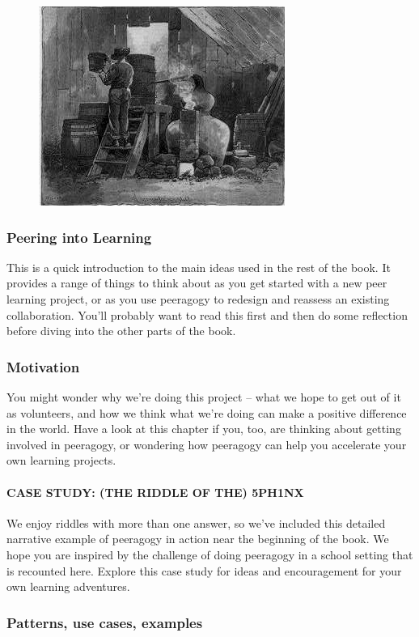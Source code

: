 \begin{figure}[htbp]
\centering
\includegraphics[width=.4\textwidth]{../pictures/moonshine.jpg}
\end{figure}

\subsubsection{Peering into Learning}

This is a quick introduction to the main ideas used in the rest of the
book. It provides a range of things to think about as you get started
with a new peer learning project, or as you use peeragogy to redesign
and reassess an existing collaboration. You'll probably want to read
this first and then do some reflection before diving into the other
parts of the book.

\subsubsection{Motivation}
You might wonder why we're doing
this project -- what we hope to get out of it as volunteers, and how we
think what we're doing can make a positive difference in the world. Have
a look at this chapter if you, too, are thinking about getting involved
in peeragogy, or wondering how peeragogy can help you accelerate your
own learning projects.

 \paragraph{CASE STUDY: (THE RIDDLE OF THE) 5PH1NX}
We enjoy riddles with more than one answer, so we've included this
detailed narrative example of peeragogy in action near the beginning of
the book. We hope you are inspired by the challenge of doing peeragogy
in a school setting that is recounted here. Explore this case study for
ideas and encouragement for your own learning adventures.

\subsubsection{Patterns, use cases, examples}

